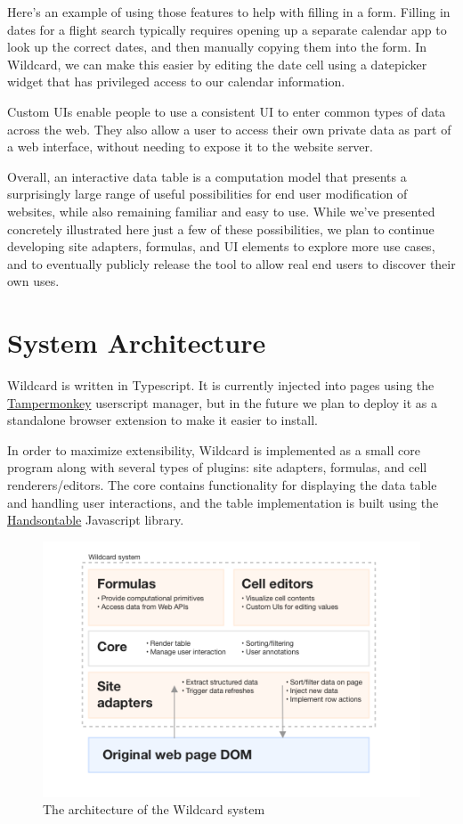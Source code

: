 \documentclass[english,submission]{programming}
\begin{document}
Here's an example of using those features to help with filling in a
form. Filling in dates for a flight search typically requires opening up
a separate calendar app to look up the correct dates, and then manually
copying them into the form. In Wildcard, we can make this easier by
editing the date cell using a datepicker widget that has privileged
access to our calendar information.

Custom UIs enable people to use a consistent UI to enter common types of
data across the web. They also allow a user to access their own private
data as part of a web interface, without needing to expose it to the
website server.

Overall, an interactive data table is a computation model that presents
a surprisingly large range of useful possibilities for end user
modification of websites, while also remaining familiar and easy to use.
While we've presented concretely illustrated here just a few of these
possibilities, we plan to continue developing site adapters, formulas,
and UI elements to explore more use cases, and to eventually publicly
release the tool to allow real end users to discover their own uses.

\hypertarget{system-architecture}{%
\section{System Architecture}\label{system-architecture}}

Wildcard is written in Typescript. It is currently injected into pages
using the \href{https://www.tampermonkey.net/}{Tampermonkey} userscript
manager, but in the future we plan to deploy it as a standalone browser
extension to make it easier to install.

In order to maximize extensibility, Wildcard is implemented as a small
core program along with several types of plugins: site adapters,
formulas, and cell renderers/editors. The core contains functionality
for displaying the data table and handling user interactions, and the
table implementation is built using the
\href{https://handsontable.com/}{Handsontable} Javascript library.

\begin{figure}
\centering
\includegraphics{media/architecture-clean.png}
\caption{The architecture of the Wildcard system}
\end{figure}
\end{document}
